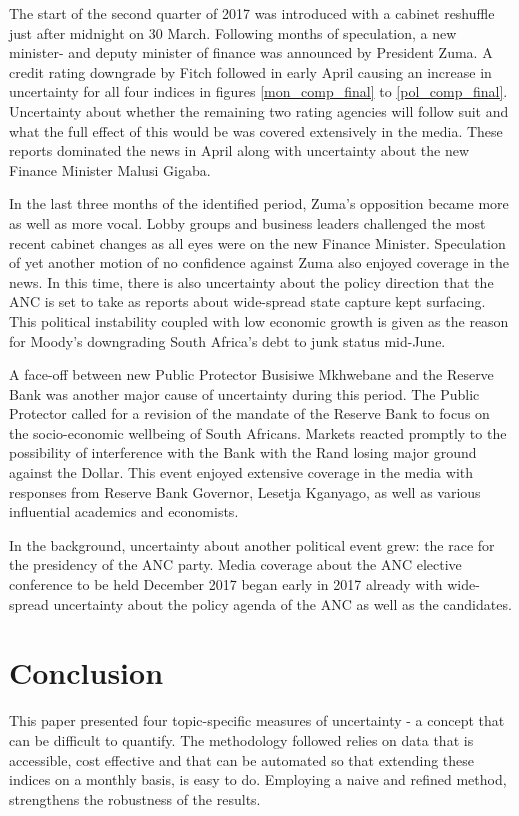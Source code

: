 \documentclass[11pt,preprint, authoryear]{elsarticle}
\numberwithin{equation}{section}
\numberwithin{figure}{section}
\numberwithin{table}{section}
\begin{document}
The start of the second quarter of 2017 was introduced with a cabinet
reshuffle just after midnight on 30 March. Following months of
speculation, a new minister- and deputy minister of finance was
announced by President Zuma. A credit rating downgrade by Fitch followed
in early April causing an increase in uncertainty for all four indices
in figures \ref{mon_comp_final} to \ref{pol_comp_final}. Uncertainty
about whether the remaining two rating agencies will follow suit and
what the full effect of this would be was covered extensively in the
media. These reports dominated the news in April along with uncertainty
about the new Finance Minister Malusi Gigaba.

In the last three months of the identified period, Zuma's opposition
became more as well as more vocal. Lobby groups and business leaders
challenged the most recent cabinet changes as all eyes were on the new
Finance Minister. Speculation of yet another motion of no confidence
against Zuma also enjoyed coverage in the news. In this time, there is
also uncertainty about the policy direction that the ANC is set to take
as reports about wide-spread state capture kept surfacing. This
political instability coupled with low economic growth is given as the
reason for Moody's downgrading South Africa's debt to junk status
mid-June.

A face-off between new Public Protector Busisiwe Mkhwebane and the
Reserve Bank was another major cause of uncertainty during this period.
The Public Protector called for a revision of the mandate of the Reserve
Bank to focus on the socio-economic wellbeing of South Africans. Markets
reacted promptly to the possibility of interference with the Bank with
the Rand losing major ground against the Dollar. This event enjoyed
extensive coverage in the media with responses from Reserve Bank
Governor, Lesetja Kganyago, as well as various influential academics and
economists.

In the background, uncertainty about another political event grew: the
race for the presidency of the ANC party. Media coverage about the ANC
elective conference to be held December 2017 began early in 2017 already
with wide-spread uncertainty about the policy agenda of the ANC as well
as the candidates.

\section{\texorpdfstring{Conclusion
\label{sec_conclude}}{Conclusion }}\label{conclusion}
This paper presented four topic-specific measures of uncertainty - a concept that can be difficult to quantify. The methodology followed relies on data that is accessible, cost effective and that can be automated so that extending these indices on a monthly basis, is easy to do. Employing a naive and refined method, strengthens the robustness of the results. 
\end{document}

